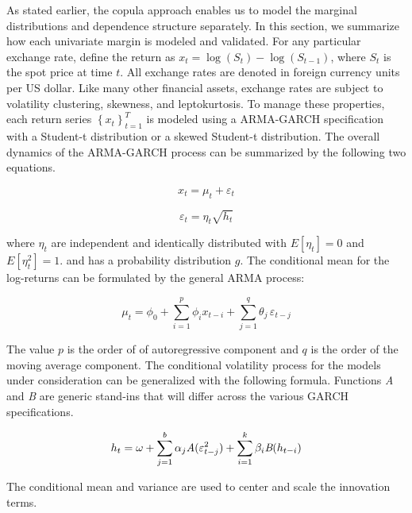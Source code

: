 \documentclass[12pt]{article}
\begin{document}
As stated earlier, the copula approach enables us to model the marginal distributions and dependence structure separately. In this section, we summarize how each univariate margin is modeled and validated. For any particular exchange rate, define the return as $x_{t} = \log \left(S_{t}\right) - \log\left(S_{t-1}\right)$, where $S_{t}$ is the spot price at time $t$. All exchange rates are denoted in foreign currency units per US dollar. Like many other financial assets, exchange rates are subject to volatility clustering, skewness, and leptokurtosis. To manage these properties, each return series $\left\{x_{t}\right\}_{t=1}^{T}$ is modeled using a ARMA-GARCH specification with a Student-t distribution or a skewed Student-t distribution. The overall dynamics of the ARMA-GARCH process can be summarized by the following two equations.

\begin{equation} \label{eqn:marginalModel}
    x_{t} = \mu_{t} + \varepsilon_{t}
\end{equation}

\begin{equation}
	\varepsilon_{t} = \eta_{t} \sqrt{h_{t}}
\end{equation}

where $\eta_{t}$ are independent and identically distributed with $E[\eta_{t}] = 0$ and $E[\eta^{2}_{t}] = 1$. and has a probability distribution $g$. The conditional mean for the log-returns can be formulated by the general ARMA process:

\begin{equation} \label{eq:conditional_mean}
    \mu_{t} = \phi_{0} + \sum_{i=1}^{p} \phi_{i} x_{t-i} + \sum_{j=1}^{q} \theta_{j} \, \varepsilon_{t - j}
\end{equation}

 The value $p$ is the order of of autoregressive component and $q$ is the order of the moving average component. The conditional volatility process for the models under consideration can be generalized with the following formula. Functions \emph{A} and \emph{B} are generic stand-ins that will differ across the various GARCH specifications.

\begin{equation} \label{eq:conditional_var}
    h_{t} = \omega + \sum_{j=1}^{b} \alpha_{j} \emph{A}(\varepsilon^{2}_{t - j}) + \sum_{i=1}^{k} \beta_{i} \emph{B}(h_{t - i})
\end{equation}

The conditional mean and variance are used to center and scale the innovation terms.
\end{document}
